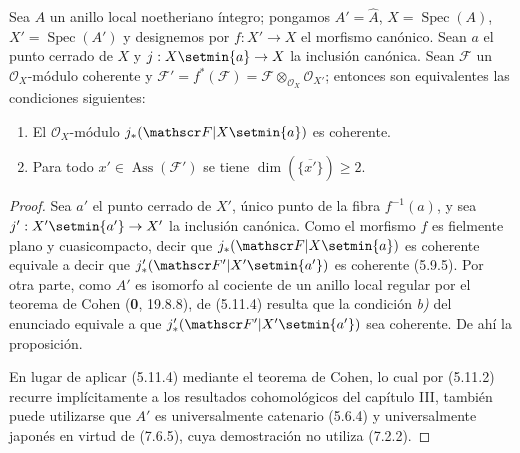 \begin{proposition}[7.2.2]
\label{IV.2.s7.2.2-fr}
Sea $A$ un anillo local noetheriano íntegro; pongamos
$A'=\widehat A$, $X=\operatorname{Spec}(A)$,
$X'=\operatorname{Spec}(A')$ y designemos por $f:X'\to X$ el
morfismo canónico. Sean $a$ el punto cerrado de $X$ y
$j:X\setmin\{a\}\to X$ la inclusión canónica. Sean $\mathscr F$ un
$\mathscr O_X$-módulo coherente y
$\mathscr F'=f^*(\mathscr F)=\mathscr F\otimes_{\mathscr O_X}\mathscr O_{X'}$; entonces son equivalentes las condiciones siguientes:
\begin{enumerate}
\item[\textup{a)}] El $\mathscr O_X$-módulo
$j_*(\mathscr F|X\setmin\{a\})$ es coherente.
\item[\textup{b)}] Para todo $x'\in\operatorname{Ass}(\mathscr F')$ se tiene
$\dim(\overline{\{x'\}})\geqslant2$.
\end{enumerate}
\end{proposition}

\begin{proof}
Sea $a'$ el punto cerrado de $X'$, único punto de la fibra
$f^{-1}(a)$, y sea $j':X'\setmin\{a'\}\to X'$ la inclusión canónica.
Como el morfismo $f$ es fielmente plano y cuasicompacto, decir que
$j_*(\mathscr F|X\setmin\{a\})$ es coherente equivale a decir que
$j'_*(\mathscr F'|X'\setmin\{a'\})$ es coherente (5.9.5).
Por otra parte, como $A'$ es isomorfo al cociente de un anillo local
regular por el teorema de Cohen (\textbf 0, 19.8.8), de (5.11.4) resulta
que la condición \emph{b)} del enunciado equivale a que
$j'_*(\mathscr F'|X'\setmin\{a'\})$ sea coherente. De ahí la
proposición.

En lugar de aplicar (5.11.4) mediante el teorema de Cohen, lo cual
por (5.11.2) recurre implícitamente a los resultados cohomológicos
del capítulo III, también puede utilizarse que $A'$ es
universalmente catenario (5.6.4) y universalmente japonés en virtud
de (7.6.5), cuya demostración no utiliza (7.2.2).
\end{proof}
